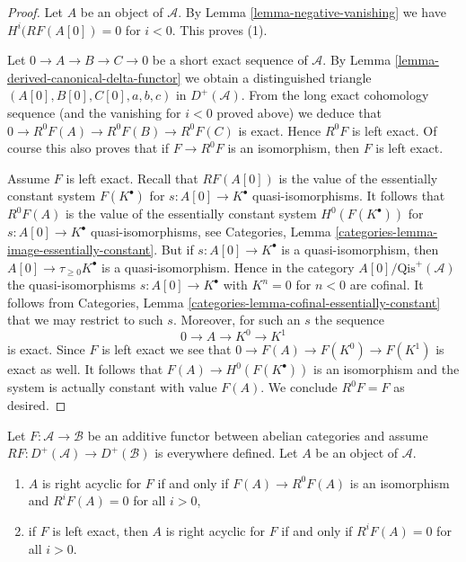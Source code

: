 \begin{proof}
Let $A$ be an object of $\mathcal{A}$. By Lemma \ref{lemma-negative-vanishing}
we have $H^i(RF(A[0]) = 0$ for $i < 0$. This proves (1).

\medskip\noindent
Let $0 \to A \to B \to C \to 0$ be a short exact sequence of $\mathcal{A}$.
By
Lemma \ref{lemma-derived-canonical-delta-functor}
we obtain a distinguished triangle
$(A[0], B[0], C[0], a, b, c)$ in $D^{+}(\mathcal{A})$.
From the long exact cohomology sequence (and the vanishing for $i < 0$
proved above) we deduce that $0 \to R^0F(A) \to R^0F(B) \to R^0F(C)$
is exact. Hence $R^0F$ is left exact. Of course this also proves that if
$F \to R^0F$ is an isomorphism, then $F$ is left exact.

\medskip\noindent
Assume $F$ is left exact. Recall that $RF(A[0])$ is the value of the
essentially constant system $F(K^\bullet)$ for $s : A[0] \to K^\bullet$
quasi-isomorphisms. It follows that $R^0F(A)$ is the value of the essentially
constant system $H^0(F(K^\bullet))$ for $s : A[0] \to K^\bullet$
quasi-isomorphisms, see Categories, Lemma
\ref{categories-lemma-image-essentially-constant}.
But if $s : A[0] \to K^\bullet$ is a quasi-isomorphism, then
$A[0] \to \tau_{\geq 0}K^\bullet$ is a quasi-isomorphism.
Hence in the category $A[0]/\text{Qis}^{+}(\mathcal{A})$ the
quasi-isomorphisms $s : A[0] \to K^\bullet$ with $K^n = 0$ for $n < 0$
are cofinal. It follows from
Categories, Lemma \ref{categories-lemma-cofinal-essentially-constant}
that we may restrict to such $s$.
Moreover, for such an $s$ the sequence
$$
0 \to A \to K^0 \to K^1
$$
is exact. Since $F$ is left exact we see that
$0 \to F(A) \to F(K^0) \to F(K^1)$ is exact as well.
It follows that $F(A) \to H^0(F(K^\bullet))$ is an isomorphism
and the system is actually constant with value $F(A)$.
We conclude $R^0F = F$ as desired.
\end{proof}

\begin{lemma}
\label{lemma-F-acyclic}
Let $F : \mathcal{A} \to \mathcal{B}$ be an additive functor
between abelian categories and assume
$RF : D^{+}(\mathcal{A}) \to D^{+}(\mathcal{B})$ is everywhere
defined. Let $A$ be an object of $\mathcal{A}$.
\begin{enumerate}
\item $A$ is right acyclic for $F$ if and only if
$F(A) \to R^0F(A)$ is an isomorphism and $R^iF(A) = 0$ for all $i > 0$,
\item if $F$ is left exact, then $A$ is right acyclic for $F$
if and only if $R^iF(A) = 0$ for all $i > 0$.
\end{enumerate}
\end{lemma}

